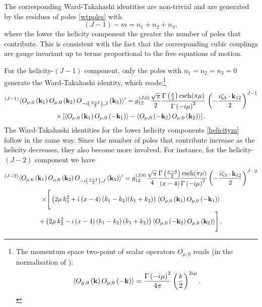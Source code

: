 \documentclass[11pt,a4paper]{article}
\begin{document}
The corresponding Ward-Takahashi identities are non-trivial and are generated by the residues of poles \eqref{wtpoles} with
\begin{equation}\label{mlWTpoles}
    \left(J-1\right)-m = n_1+n_2+n_3,
\end{equation}
where the lower the helicity component the greater the number of poles that contribute. This is consistent with the fact that the corresponding cubic couplings \cite{Berends:1985xx,Bekaert:2010hk} are gauge invariant up to terms proportional to the free equations of motion.

For the helicity-$\left(J-1\right)$ component, only the poles with $n_1=n_2=n_3=0$ generate the Ward-Takahashi identity, which reads:\footnote{The momentum space two-point of scalar operators $O_{\mu,0}$ reads (in the normalisation of \cite{Sleight:2019hfp}):
\begin{equation}
    \langle O_{\mu,0}\left({\bf k}\right)O_{\mu,0}\left(-{\bf k}\right)\rangle = \frac{\Gamma\left(-i\mu\right)^2}{4\pi}\left(\frac{k}{2}\right)^{2 i \mu }.
\end{equation}}
\begin{multline}\label{mlhj-13pt}
  {}^{\left(J-1\right)}\langle O_{\mu,0}\left({\bf k}_1\right)O_{\mu,0}\left({\bf k}_2\right)O_{-i\left(\frac{x-4}{2}\right),J}\left({\bf k}_3\right)  \rangle^\prime=g^{\left(J,0\right)}_{12}\frac{\sqrt{\pi}}{2}\frac{\Gamma \left(\frac{x}{2}\right) \text{csch}(\pi  \mu )}{\Gamma\left(-i\mu\right)^2}\,\left(-\frac{i\zeta_3 \cdot {\bf k}_{12}}{2}\right)^{J-1}\\ \times \left[\langle O_{\mu,0}\left({\bf k}_1\right)O_{\mu,0}\left(-{\bf k}_1\right)\rangle -\langle O_{\mu,0}\left(-{\bf k}_2\right)O_{\mu,0}\left({\bf k}_2\right)\rangle\right].
\end{multline}
The Ward-Takahashi identities for the lower helicity components \eqref{helicitym} follow in the same way. Since the number of poles that contribute increase as the helicity decreases, they also become more involved. For instance, for the helicity-$\left(J-2\right)$ component we have
\begin{multline}\label{helj2ward}
 {}^{\left(J-2\right)}\langle O_{\mu,0}\left({\bf k}_1\right)O_{\mu,0}\left({\bf k}_2\right)O_{-i\left(\frac{x-4}{2}\right),J}\left({\bf k}_3\right)  \rangle^\prime=g^{\left(J,0\right)}_{12}\frac{\sqrt{\pi}}{4}\frac{\Gamma \left(\frac{x-4}{2}\right) \text{csch}(\pi  \mu )}{\left(x-4\right)\Gamma\left(-i\mu\right)^2}  \left(-\frac{i\zeta_3 \cdot {\bf k}_{12}}{2}\right)^{J-2}\\ \times  \Bigg[ \left(2 \mu \, k_3^2+i \left(x-4\right) (k_1-k_2) (k_1+k_2)\right)\langle O_{\mu,0}\left({\bf k}_1\right)O_{\mu,0}\left(-{\bf k}_1\right)\rangle\\+\left(2 \mu \, k_3^2-i \left(x-4\right) \left(k_1-k_2\right)\left(k_1+k_2\right)\right)\langle O_{\mu,0}\left(-{\bf k}_2\right)O_{\mu,0}\left({\bf k}_2\right)\rangle\Bigg]\,.
\end{multline}
\end{document}
